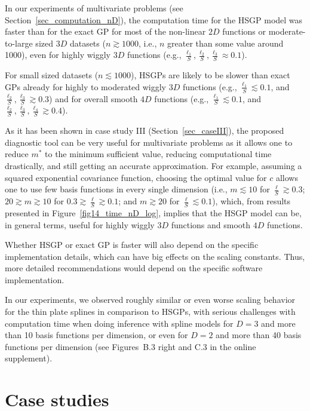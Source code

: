 In our experiments of multivariate problems (see Section~\ref{sec_computation_nD}), the computation time for the HSGP model was faster than for the exact GP for most of the non-linear $2D$ functions or moderate-to-large sized $3D$ datasets ($n \gtrsim 1000$, i.e., $n$ greater than some value around 1000), even for highly wiggly $3D$ functions (e.g., $\frac{\ell_1}{S}, \frac{\ell_2}{S}, \frac{\ell_3}{S} \approx 0.1$).

For small sized datasets ($n\lesssim 1000$), HSGPs are likely to be slower than exact GPs already for highly to moderated wiggly $3D$ functions (e.g., $\frac{\ell_1}{S} \lesssim 0.1$, and $\frac{\ell_2}{S}, \frac{\ell_3}{S} \gtrsim 0.3$) and for overall smooth $4D$ functions (e.g., $\frac{\ell_1}{S} \lesssim 0.1$, and $\frac{\ell_2}{S}, \frac{\ell_3}{S}, \frac{\ell_4}{S} \gtrsim 0.4$).

As it has been shown in case study III (Section~\ref{sec_caseIII}), the proposed diagnostic tool can be very useful for multivariate problems as it allows one to reduce $m^*$ to the minimum sufficient value, reducing computational time drastically, and still getting an accurate approximation. For example, assuming a squared exponential covariance function, choosing the optimal value for $c$ allows one to use few basis functions in every single dimension (i.e., $m \lesssim 10$ for $\frac{\ell}{S} \gtrsim 0.3$; $20 \gtrsim m \gtrsim 10$ for $0.3 \gtrsim \frac{\ell}{S} \gtrsim 0.1$; and $m \gtrsim 20$ for $\frac{\ell}{S} \lesssim 0.1$), which, from results presented in Figure~\ref{fig14_time_nD_log}, implies that the HSGP model can be, in general terms, useful for highly wiggly $3D$ functions and smooth $4D$ functions.

Whether HSGP or exact GP is faster will also depend on the specific implementation details, which can have big effects on the scaling constants. Thus, more detailed recommendations would depend on the specific software implementation.

In our experiments, we observed roughly similar or even worse scaling behavior for the thin plate splines in comparison to HSGPs, with serious challenges with computation time when doing inference with spline models for $D=3$ and more than 10 basis functions per dimension, or even for $D=2$ and more than 40 basis functions per dimension (see Figures~B.3 right and C.3 in the online supplement).


\section{Case studies}\label{sec_cases}

